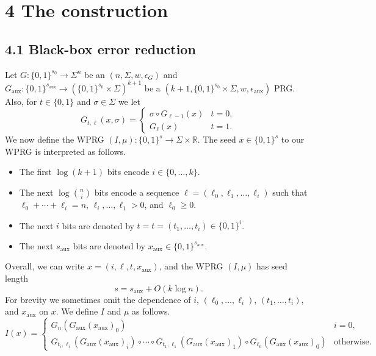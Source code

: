 \documentclass[10pt,a4paper]{article}
\begin{document}
\section*{4 The construction}
\subsection*{4.1 Black-box error reduction}
Let $G:\{0,1\}^{s_0}\to\Sigma^n$ be an $(n,\Sigma,w,\epsilon_G)$ and $G_{\mathrm{aux}}:\{0,1\}^{s_{\mathrm{aux}}}\to(\{0,1\}^{s_0}\times\Sigma)^{k+1}$ be a $(k+1,\{0,1\}^{s_0}\times\Sigma,w,\epsilon_{\mathrm{aux}})$ PRG. Also, for $t\in\{0,1\}$ and $\sigma\in\Sigma$ we let
\begin{equation}\tag{9}G_{t,\ell}(x,\sigma)=\begin{cases}\sigma\circ G_{\ell-1}(x)&t=0,\\G_\ell(x)&t=1.\end{cases}\end{equation}
We now define the WPRG $(I,\mu):\{0,1\}^s\to\Sigma\times\mathbb R$. The seed $x\in\{0,1\}^s$ to our WPRG is interpreted as follows.
\begin{itemize}
\item The first $\log(k+1)$ bits encode $i\in\{0,\ldots,k\}$.
\item The next $\log\binom ni$ bits encode a sequence $\ell=(\ell_0,\ell_1,\ldots,\ell_i)$ such that $\ell_0+\cdots+\ell_i=n$, $\ell_i,\ldots,\ell_1>0$, and $\ell_0\ge0$.
\item The next $i$ bits are denoted by $t=t=(t_1,\ldots,t_i)\in\{0,1\}^i$.
\item The next $s_{\mathrm{aux}}$ bits are denoted by $x_{\mathrm{aux}}\in\{0,1\}^{s_{\mathrm{aux}}}$.
\end{itemize}
Overall, we can write $x=(i,\ell,t,x_{\mathrm{aux}})$, and the WPRG $(I,\mu)$ has seed length
\begin{equation}\tag{10}s=s_{\mathrm{aux}}+O(k\log n).\end{equation}
For brevity we sometimes omit the dependence of $i$, $(\ell_0,\ldots,\ell_i)$, $(t_1,\ldots,t_i)$, and $x_{\mathrm{aux}}$ on $x$. We define $I$ and $\mu$ as follows.
\[I(x)=\begin{cases}G_n(G_{\mathrm{aux}}(x_{\mathrm{aux}})_0)&i=0,\\G_{t_i,\ell_i}(G_{\mathrm{aux}}(x_{\mathrm{aux}})_i)\circ\cdots\circ G_{t_1,\ell_1}(G_{\mathrm{aux}}(x_{\mathrm{aux}})_1)\circ G_{\ell_0}(G_{\mathrm{aux}}(x_{\mathrm{aux}})_0)&\text{otherwise.}\end{cases}\]
\end{document}
